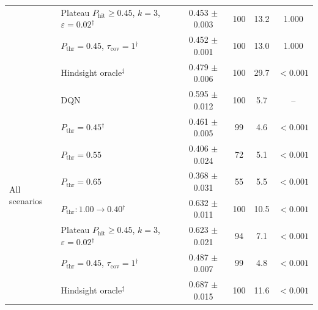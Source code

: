\begin{table}[htbp]
\begin{tabular}{llcccc}
 & Plateau $P_{\mathrm{hit}}\geq0.45$, $k=3$, $\varepsilon=0.02$$^{\dagger}$ & 0.453 $\pm$ 0.003 & 100 & 13.2 & 1.000 \\
 & $P_{\mathrm{thr}}=0.45$, $\tau_{\mathrm{cov}}=1$$^{\dagger}$ & 0.452 $\pm$ 0.001 & 100 & 13.0 & 1.000 \\
 & Hindsight oracle$^{\ddagger}$ & 0.479 $\pm$ 0.006 & 100 & 29.7 & $<0.001$ \\
\midrule
\multirow{8}{*}{All scenarios} & DQN & 0.595 $\pm$ 0.012 & 100 & 5.7 & -- \\
 & $P_{\mathrm{thr}}=0.45$$^{\dagger}$ & 0.461 $\pm$ 0.005 & 99 & 4.6 & $<0.001$ \\
 & $P_{\mathrm{thr}}=0.55$ & 0.406 $\pm$ 0.024 & 72 & 5.1 & $<0.001$ \\
 & $P_{\mathrm{thr}}=0.65$ & 0.368 $\pm$ 0.031 & 55 & 5.5 & $<0.001$ \\
 & $P_{\mathrm{thr}}: 1.00 \to 0.40$$^{\dagger}$ & 0.632 $\pm$ 0.011 & 100 & 10.5 & $<0.001$ \\
 & Plateau $P_{\mathrm{hit}}\geq0.45$, $k=3$, $\varepsilon=0.02$$^{\dagger}$ & 0.623 $\pm$ 0.021 & 94 & 7.1 & $<0.001$ \\
 & $P_{\mathrm{thr}}=0.45$, $\tau_{\mathrm{cov}}=1$$^{\dagger}$ & 0.487 $\pm$ 0.007 & 99 & 4.8 & $<0.001$ \\
 & Hindsight oracle$^{\ddagger}$ & 0.687 $\pm$ 0.015 & 100 & 11.6 & $<0.001$ \\
\bottomrule
\end{tabular}
\end{table}
